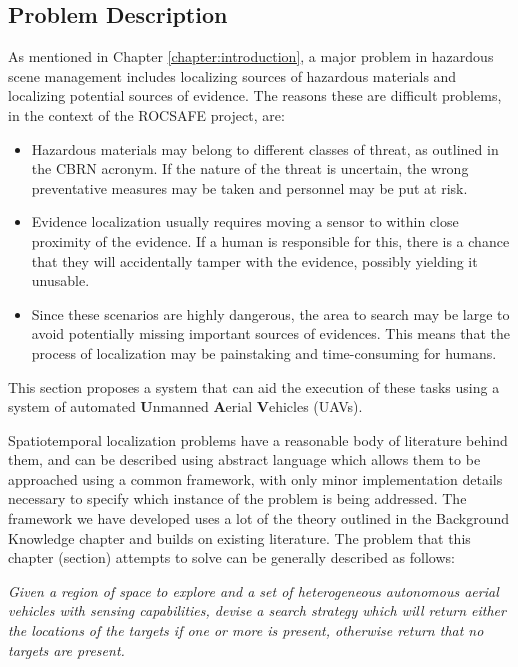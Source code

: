 
\subsection{Problem Description}
As mentioned in Chapter \ref{chapter:introduction}, a major problem in hazardous scene management includes localizing sources of hazardous materials and localizing potential sources of evidence. The reasons these are difficult problems, in the context of the ROCSAFE project, are:
\begin{itemize}
    \item Hazardous materials may belong to different classes of threat, as outlined in the CBRN acronym. If the nature of the threat is uncertain, the wrong preventative measures may be taken and personnel may be put at risk. 
    \item Evidence localization usually requires moving a sensor to within close proximity of the evidence. If a human is responsible for this, there is a chance that they will accidentally tamper with the evidence, possibly yielding it unusable.
    \item Since these scenarios are highly dangerous, the area to search may be large to avoid potentially missing important sources of evidences. This means that the process of localization may be painstaking and time-consuming for humans.
\end{itemize}
This section proposes a system that can aid the execution of these tasks using a system of automated \textbf{U}nmanned \textbf{A}erial \textbf{V}ehicles (UAVs). \par



Spatiotemporal localization problems have a reasonable body of literature behind them, and can be described using abstract language which allows them to be approached using a common framework, with only minor implementation details necessary to specify which instance of the problem is being addressed. The framework we have developed uses a lot of the theory outlined in the Background Knowledge chapter and builds on existing literature. The problem that this chapter (section) attempts to solve can be generally described as follows: \par

\textit{Given a region of space to explore and a set of heterogeneous autonomous aerial vehicles with sensing capabilities, devise a search strategy which will return either the locations of the targets if one or more is present, otherwise return that no targets are present.} \par

